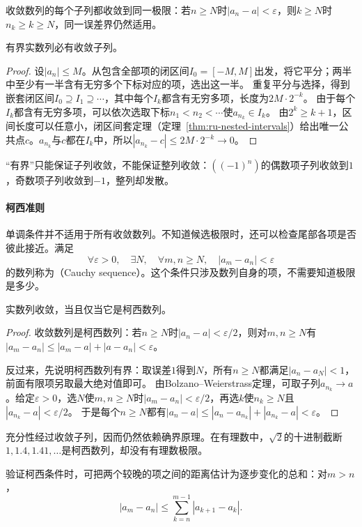 收敛数列的每个子列都收敛到同一极限：若$n\geq N$时$|a_n-a|<\varepsilon$，则$k\geq N$时$n_k\geq k\geq N$，同一误差界仍然适用。
\begin{theorem}
\label{thm:analysis-bounded-subsequence}
有界实数列必有收敛子列。
\end{theorem}
\begin{proof}
设$|a_n|\leq M$。从包含全部项的闭区间$I_0=[-M,M]$出发，将它平分；两半中至少有一半含有无穷多个下标对应的项，选出这一半。
重复平分与选择，得到嵌套闭区间$I_0\supseteq I_1\supseteq\cdots$，其中每个$I_k$都含有无穷多项，长度为$2M\cdot2^{-k}$。
由于每个$I_k$都含有无穷多项，可以依次选取下标$n_1<n_2<\cdots$使$a_{n_k}\in I_k$。
由$2^k\geq k+1$，区间长度可以任意小，闭区间套定理（定理~\ref{thm:ru-nested-intervals}）给出唯一公共点$c$。$a_{n_k}$与$c$都在$I_k$中，所以$|a_{n_k}-c|\leq2M\cdot2^{-k}\to0$。
\end{proof}
“有界”只能保证子列收敛，不能保证整列收敛：$((-1)^n)$的偶数项子列收敛到$1$，奇数项子列收敛到$-1$，整列却发散。

\paragraph{柯西准则}
单调条件并不适用于所有收敛数列。不知道候选极限时，还可以检查尾部各项是否彼此接近。满足
\[
 \forall\varepsilon>0,\quad\exists N,\quad\forall m,n\geq N,\quad|a_m-a_n|<\varepsilon
\]
的数列称为（Cauchy sequence）。这个条件只涉及数列自身的项，不需要知道极限是多少。
\begin{theorem}[柯西收敛准则]
\label{thm:analysis-cauchy-convergence}
实数列收敛，当且仅当它是柯西数列。
\end{theorem}
\begin{proof}
收敛数列是柯西数列：若$n\geq N$时$|a_n-a|<\varepsilon/2$，则对$m,n\geq N$有$|a_m-a_n|\leq|a_m-a|+|a-a_n|<\varepsilon$。

反过来，先说明柯西数列有界：取误差$1$得到$N$，所有$n\geq N$都满足$|a_n-a_N|<1$，前面有限项另取最大绝对值即可。
由Bolzano--Weierstrass定理，可取子列$a_{n_k}\to a$。给定$\varepsilon>0$，选$N$使$m,n\geq N$时$|a_m-a_n|<\varepsilon/2$，再选$k$使$n_k\geq N$且$|a_{n_k}-a|<\varepsilon/2$。
于是每个$n\geq N$都有$|a_n-a|\leq|a_n-a_{n_k}|+|a_{n_k}-a|<\varepsilon$。
\end{proof}
充分性经过收敛子列，因而仍然依赖确界原理。在有理数中，$\sqrt2$的十进制截断$1,1.4,1.41,\ldots$是柯西数列，却没有有理数极限。

验证柯西条件时，可把两个较晚的项之间的距离估计为逐步变化的总和：对$m>n$，
\begin{equation}
 |a_m-a_n|\leq\sum_{k=n}^{m-1}|a_{k+1}-a_k|.
 \label{eq:analysis-cauchy-tail-bound}
\end{equation}

